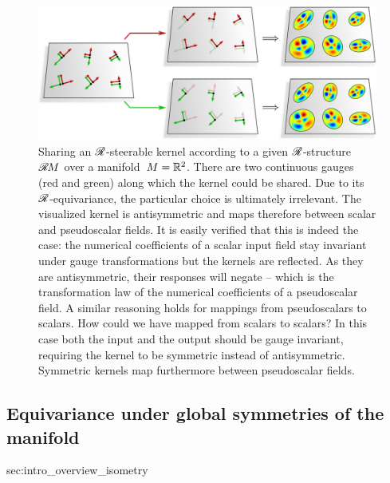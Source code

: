 \begin{figure}
    \centering
    \includegraphics[width=1.\textwidth]{figures/intro_kernel_alignment_reflect.pdf}
    \caption{\small
        Sharing an $\mathscr{R}$-steerable kernel according to a given $\mathscr{R}$-structure $\mathscr{R}\mkern-1.8muM$ over a manifold~$M = \mathbb{R}^2$.
        There are two continuous gauges (red and green) along which the kernel could be shared.
        Due to its $\mathscr{R}$-equivariance, the particular choice is ultimately irrelevant.
        The visualized kernel is antisymmetric and maps therefore between scalar and pseudoscalar fields.
        It is easily verified that this is indeed the case:
        the numerical coefficients of a scalar input field stay invariant under gauge transformations but the kernels are reflected.
        As they are antisymmetric, their responses will negate -- which is the transformation law of the numerical coefficients of a pseudoscalar field.
        A similar reasoning holds for mappings from pseudoscalars to scalars.
        How could we have mapped from scalars to scalars?
        In this case both the input and the output should be gauge invariant, requiring the kernel to be symmetric instead of antisymmetric.
        Symmetric kernels map furthermore between pseudoscalar fields.
    }
    \label{fig:intro_kernel_alignment_reflect}
\end{figure}





\toclesslab\subsection{Equivariance under global symmetries of the manifold}{sec:intro_overview_isometry}

